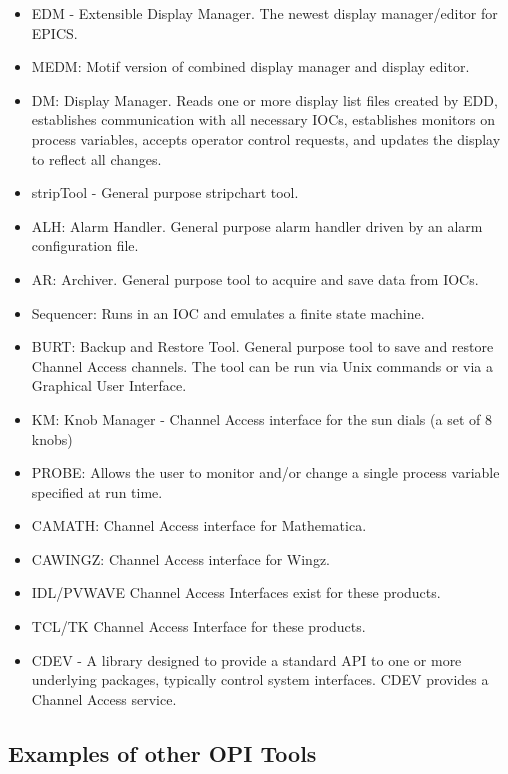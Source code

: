 \begin{itemize}\item EDM - Extensible Display Manager. The newest display manager/editor for EPICS.

\item MEDM: Motif version of combined display manager and display editor.

\item DM:  Display Manager. Reads one or more display list files created by EDD, establishes communication with all 
necessary IOCs, establishes monitors on process variables, accepts operator control requests, and updates the 
display to reflect all changes.

\item stripTool - General purpose stripchart tool.

\item ALH: Alarm Handler. General purpose alarm handler driven by an alarm configuration file.

\item AR:  Archiver. General purpose tool to acquire and save data from IOCs.

\item Sequencer:  Runs in an IOC and emulates a finite state machine.

\item BURT:  Backup and Restore Tool. General purpose tool to save and restore Channel Access channels. The tool can 
be run via Unix commands or via a Graphical User Interface.

\item KM:  Knob Manager - Channel Access interface for the sun dials (a set of 8 knobs)

\item PROBE: Allows the user to monitor and/or change a single process variable specified at run time.

\item CAMATH:  Channel Access interface for Mathematica.

\item CAWINGZ:  Channel Access interface for Wingz.

\item IDL/PVWAVE Channel Access Interfaces exist for these products.

\item TCL/TK Channel Access Interface for these products.

\item CDEV - A library designed to provide a standard API to one or more underlying packages, typically control 
system interfaces. CDEV provides a Channel Access service.

\end{itemize}\subsection{Examples of other OPI Tools}

